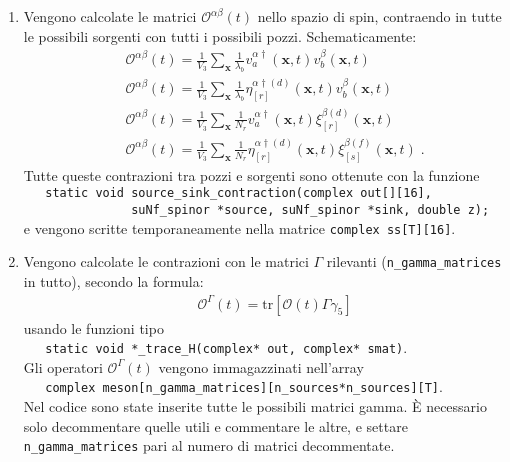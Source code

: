 \documentclass[a4paper]{article}
\newcommand{\tr}{\mathrm{tr}}
\newcommand{\point}{\; .}
\begin{document}
\begin{enumerate}
\item Vengono calcolate le matrici $\mathcal{O}^{\alpha\beta}(t)$ nello spazio di spin, contraendo in tutte le possibili sorgenti con tutti i possibili pozzi. Schematicamente:
\begin{eqnarray*}
&& \mathcal{O}^{\alpha\beta}(t) = \frac{1}{V_3} \sum_{\mathbf{x}} \frac{1}{\lambda_b} v^{\alpha\dagger}_a(\mathbf{x},t) v^\beta_b(\mathbf{x},t) \\
&& \mathcal{O}^{\alpha\beta}(t) = \frac{1}{V_3} \sum_{\mathbf{x}} \frac{1}{\lambda_b} \eta^{\alpha\dagger(d)}_{[r]}(\mathbf{x},t) v^\beta_b(\mathbf{x},t) \\
&& \mathcal{O}^{\alpha\beta}(t) = \frac{1}{V_3} \sum_{\mathbf{x}} \frac{1}{N_r} v^{\alpha\dagger}_a(\mathbf{x},t) \xi^{\beta(d)}_{[r]}(\mathbf{x},t) \\
&& \mathcal{O}^{\alpha\beta}(t) = \frac{1}{V_3} \sum_{\mathbf{x}} \frac{1}{N_r} \eta^{\alpha\dagger(d)}_{[r]}(\mathbf{x},t) \xi^{\beta(f)}_{[s]}(\mathbf{x},t) \point
\end{eqnarray*}
Tutte queste contrazioni tra pozzi e sorgenti sono ottenute con la funzione\\
\verb|   static void source_sink_contraction(complex out[][16],|\\
\verb|               suNf_spinor *source, suNf_spinor *sink, double z);|\\
e vengono scritte temporaneamente nella matrice \verb|complex ss[T][16]|. 

\item Vengono calcolate le contrazioni con le matrici $\Gamma$ rilevanti (\verb|n_gamma_matrices| in tutto), secondo la formula:
\begin{eqnarray*}
&& \mathcal{O}^\Gamma(t) = \tr \left[ \mathcal{O}(t) \Gamma \gamma_5 \right]
\end{eqnarray*}
usando le funzioni tipo\\
\verb|   static void *_trace_H(complex* out, complex* smat)|.\\
Gli operatori $\mathcal{O}^\Gamma(t)$ vengono immagazzinati nell'array\\
\verb|   complex meson[n_gamma_matrices][n_sources*n_sources][T]|.\\
Nel codice sono state inserite tutte le possibili matrici gamma. \`{E} necessario solo decommentare quelle utili e commentare le altre, e settare \verb|n_gamma_matrices| pari al numero di matrici decommentate.


\end{enumerate}
\end{document}

